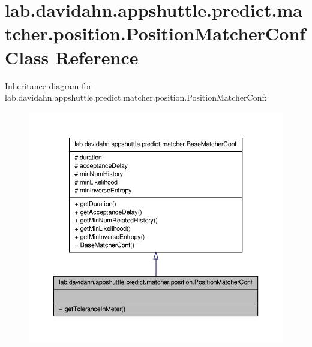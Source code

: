 \hypertarget{classlab_1_1davidahn_1_1appshuttle_1_1predict_1_1matcher_1_1position_1_1_position_matcher_conf}{\section{lab.\-davidahn.\-appshuttle.\-predict.\-matcher.\-position.\-Position\-Matcher\-Conf \-Class \-Reference}
\label{classlab_1_1davidahn_1_1appshuttle_1_1predict_1_1matcher_1_1position_1_1_position_matcher_conf}
}


\-Inheritance diagram for lab.\-davidahn.\-appshuttle.\-predict.\-matcher.\-position.\-Position\-Matcher\-Conf\-:
\nopagebreak
\begin{figure}[H]
\begin{center}
\leavevmode
\includegraphics[width=350pt]{classlab_1_1davidahn_1_1appshuttle_1_1predict_1_1matcher_1_1position_1_1_position_matcher_conf__inherit__graph}
\end{center}
\end{figure}


